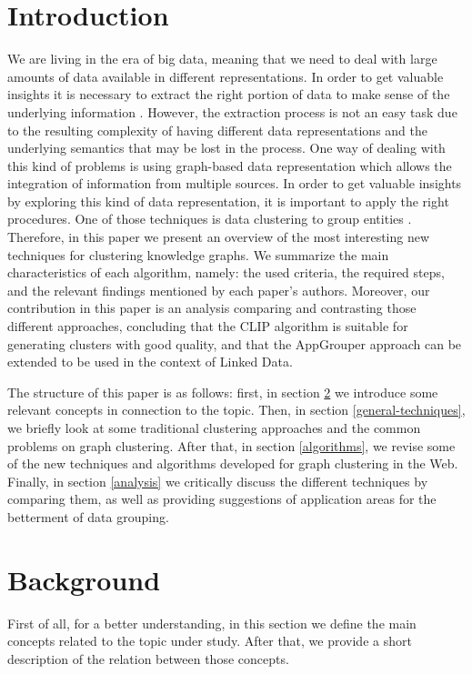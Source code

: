 \documentclass[runningheads]{llncs}
\begin{document}
\section{Introduction} \label{introduction}
We are living in the era of big data, meaning that we need to deal with large amounts of data available in different representations. In order to get valuable insights it is necessary to extract the right portion of data to make sense of the underlying information \cite{Pedrycz}. However, the extraction process is not an easy task due to the resulting complexity of having different data representations and the underlying semantics that may be lost in the process. One way of dealing with this kind of problems is using graph-based data representation which allows the integration of information from multiple sources. In order to get valuable insights by exploring this kind of data representation, it is important to apply the right procedures. One of those techniques is data clustering to group entities \cite{Pedrycz}. Therefore, in this paper we present an overview of the most interesting new techniques for clustering knowledge graphs. We summarize the main characteristics of each algorithm, namely: the used criteria, the required steps, and the relevant findings mentioned by each paper's authors. Moreover, our contribution in this paper is an analysis comparing and contrasting those different approaches, concluding that the CLIP algorithm is suitable for generating clusters with good quality, and that the AppGrouper approach can be extended to be used in the context of Linked Data.

The structure of this paper is as follows: first, in section \ref{background} we introduce some relevant concepts in connection to the topic. Then, in section \ref{general-techniques}, we briefly look at some traditional clustering approaches and the common problems on graph clustering. After that, in section \ref{algorithms}, we revise some of the new techniques and algorithms developed for graph clustering in the Web. Finally, in section \ref{analysis} we critically discuss the different techniques by comparing them, as well as providing suggestions of application areas for the betterment of data grouping. 


\section{Background} \label{background}
First of all, for a better understanding, in this section we define the main concepts related to the topic under study. After that, we provide a short description of the relation between those concepts.
\end{document}
